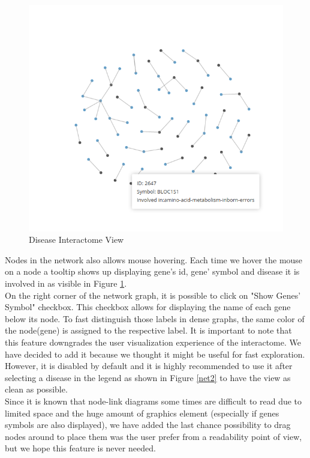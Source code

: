 \documentclass[12pt,twocolumn,twoside]{article}
\begin{document}
	\begin{figure}
		\includegraphics[width=.95\linewidth]{network.png}
		\caption{Disease Interactome View}
		\label{net}
	\end{figure}
	Nodes in the network also allows mouse hovering. Each time we hover the mouse on a node a tooltip shows up displaying gene's id, gene' symbol and disease it is involved in as visible in Figure \ref{net}.\\
	On the right corner of the network graph, it is possible to click on "Show Genes' Symbol" checkbox. This checkbox allows for displaying the name of each gene below its node. To fast distinguish those labels in dense graphs, the same color of the node(gene) is assigned to the respective label. It is important to note that this feature downgrades the user visualization experience of the interactome. We have decided to add it because we thought it might be useful for fast exploration. However, it is disabled by default and it is highly recommended to use it after selecting a disease in the legend as shown in Figure \ref{net2} to have the view as clean as possible.\\ 
	Since it is known that node-link diagrams some times are difficult to read due to limited space and the huge amount of graphics element (especially if genes symbols are also displayed), we have added the last chance possibility to drag nodes around to place them was the user prefer from a readability point of view, but we hope this feature is never needed.
	
\end{document}
